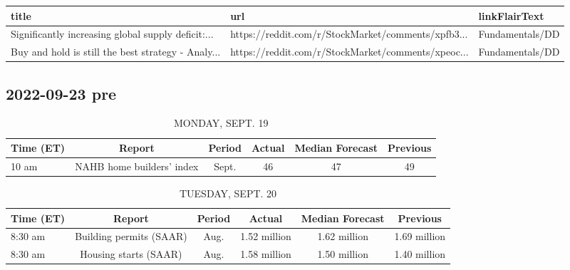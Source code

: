 \documentclass{book}
\begin{document}
  
  
  \begin{table}[htbp]%
  \centering%
  \begin{adjustbox}{width=1\textwidth}%
  \begin{tabular}{lll}
  \toprule
                                               title &                                                url &   linkFlairText \\
  \midrule
  Significantly increasing global supply deficit:... & https://reddit.com/r/StockMarket/comments/xpfb3... & Fundamentals/DD \\
  Buy and hold is still the best strategy - Analy... & https://reddit.com/r/StockMarket/comments/xpeoc... & Fundamentals/DD \\
  \bottomrule
  \end{tabular}
  \end{adjustbox}%
  \end{table}
  
  
  

  
  \subsection{ 2022-09-23 pre }
  \normalsize%
  
  
  \begin{table}[htbp]%
  \caption{MONDAY, SEPT. 19}%
  \centering%
  \begin{adjustbox}{width=1\textwidth}%
  \begin{tabular}{lccccc}
  \toprule
  Time (ET) &                    Report & Period & Actual & Median Forecast & Previous \\
  \midrule
      10 am & NAHB home builders' index &  Sept. &     46 &              47 &       49 \\
  \bottomrule
  \end{tabular}
  \end{adjustbox}%
  \end{table}
  
  
  
  \begin{table}[htbp]%
  \caption{TUESDAY, SEPT. 20}%
  \centering%
  \begin{adjustbox}{width=1\textwidth}%
  \begin{tabular}{lccccc}
  \toprule
  Time (ET) &                  Report & Period &       Actual & Median Forecast &     Previous \\
  \midrule
    8:30 am & Building permits (SAAR) &   Aug. & 1.52 million &    1.62 million & 1.69 million \\
    8:30 am &   Housing starts (SAAR) &   Aug. & 1.58 million &    1.50 million & 1.40 million \\
  \bottomrule
  \end{tabular}
  \end{adjustbox}%
  \end{table}
  
\end{document}
